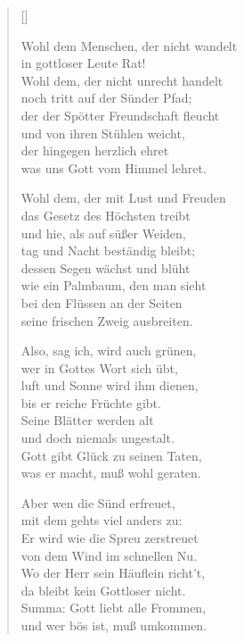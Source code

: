 \begin{multicols}{2}
\settowidth{\versewidth}{Wohl dem Menschen, der nicht wandelt}
\begin{verse}[\versewidth]

 Wohl dem Menschen, der nicht wandelt\\
in gottloser Leute Rat!\\
Wohl dem, der nicht unrecht handelt\\
noch tritt auf der Sünder Pfad;\\
der der Spötter Freundschaft fleucht\\
und von ihren Stühlen weicht,\\
der hingegen herzlich ehret\\
was uns Gott vom Himmel lehret.

 Wohl dem, der mit Lust und Freuden\\
das Gesetz des Höchsten treibt\\
und hie, als auf süßer Weiden,\\
tag und Nacht beständig bleibt;\\
dessen Segen wächst und blüht\\
wie ein Palmbaum, den man sieht\\
bei den Flüssen an der Seiten\\
seine frischen Zweig ausbreiten.

 Also, sag ich, wird auch grünen,\\
wer in Gottes Wort sich übt,\\
luft und Sonne wird ihm dienen,\\
bis er reiche Früchte gibt.\\
Seine Blätter werden alt\\
und doch niemals ungestalt.\\
Gott gibt Glück zu seinen Taten,\\
was er macht, muß wohl geraten.

 Aber wen die Sünd erfreuet,\\
mit dem gehts viel anders zu:\\
Er wird wie die Spreu zerstreuet\\
von dem Wind im schnellen Nu.\\
Wo der Herr sein Häuflein richt't,\\
da bleibt kein Gottloser nicht.\\
Summa: Gott liebt alle Frommen,\\
und wer bös ist, muß umkommen.

\end{verse}
\end{multicols}
